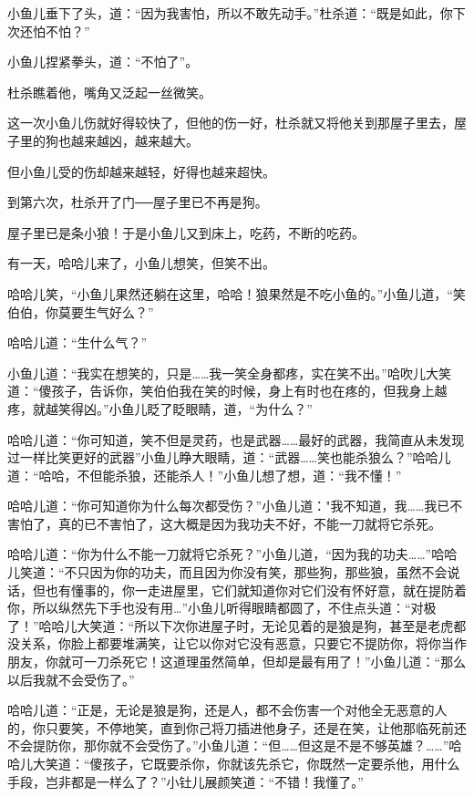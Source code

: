 \documentclass[12pt,oneside]{book}
\begin{document}
小鱼儿垂下了头，道：``因为我害怕，所以不敢先动手。''杜杀道：``既是如此，你下次还怕不怕？''

小鱼儿捏紧拳头，道：``不怕了''。

杜杀瞧着他，嘴角又泛起一丝微笑。

这一次小鱼儿伤就好得较快了，但他的伤一好，杜杀就又将他关到那屋子里去，屋子里的狗也越来越凶，越来越大。

但小鱼儿受的伤却越来越轻，好得也越来超快。

到第六次，杜杀开了门──屋子里已不再是狗。

屋子里已是条小狼！于是小鱼儿又到床上，吃药，不断的吃药。

有一天，哈哈儿来了，小鱼儿想笑，但笑不出。

哈哈儿笑，``小鱼儿果然还躺在这里，哈哈！狼果然是不吃小鱼的。''小鱼儿道，``笑伯伯，你莫要生气好么？''

哈哈儿道：``生什么气？''

小鱼儿道：``我实在想笑的，只是\ldots\ldots 我一笑全身都疼，实在笑不出。''哈吹儿大笑道：``傻孩子，告诉你，笑伯伯我在笑的时候，身上有时也在疼的，但我身上越疼，就越笑得凶。''小鱼儿眨了眨眼睛，道，``为什么？''

哈哈儿道：``你可知道，笑不但是灵药，也是武器\ldots\ldots 最好的武器，我简直从未发现过一样比笑更好的武器''小鱼儿睁大眼睛，道：``武器\ldots\ldots 笑也能杀狼么？''哈哈儿道：``哈哈，不但能杀狼，还能杀人！''小鱼儿想了想，道：``我不懂！''

哈哈儿道：``你可知道你为什么每次都受伤？''小鱼儿道："我不知道，我\ldots\ldots 我已不害怕了，真的已不害怕了，这大概是因为我功夫不好，不能一刀就将它杀死。

哈哈儿道：``你为什么不能一刀就将它杀死？''小鱼儿道，``因为我的功夫\ldots\ldots{}''哈哈儿笑道：``不只因为你的功夫，而且因为你没有笑，那些狗，那些狼，虽然不会说话，但也有懂事的，你一走进屋里，它们就知道你对它们没有怀好意，就在提防着你，所以纵然先下手也没有用\ldots{}''小鱼儿听得眼睛都圆了，不住点头道：``对极了！''哈哈儿大笑道：``所以下次你进屋子时，无论见着的是狼是狗，甚至是老虎都没关系，你脸上都要堆满笑，让它以你对它没有恶意，只要它不提防你，将你当作朋友，你就可一刀杀死它！这道理虽然简单，但却是最有用了！''小鱼儿道：``那么以后我就不会受伤了。''

哈哈儿道：``正是，无论是狼是狗，还是人，都不会伤害一个对他全无恶意的人的，你只要笑，不停地笑，直到你己将刀插进他身子，还是在笑，让他那临死前还不会提防你，那你就不会受伤了。''小鱼儿道：``但\ldots\ldots 但这是不是不够英雄？\ldots\ldots{}''哈哈儿大笑道：``傻孩子，它既要杀你，你就该先杀它，你既然一定要杀他，用什么手段，岂非都是一样么了？''小钍儿展颜笑道：``不错！我懂了。''
\end{document}
